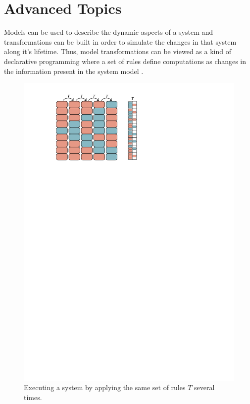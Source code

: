 \section{Advanced Topics}
\label{sec:advanced_topics}

Models can be used to describe the dynamic aspects of a system and
transformations can be built in order to simulate the changes in that system
along it's lifetime. Thus, model transformations can be viewed as a kind of
declarative programming where a set of rules define computations as changes in
the information present in the system model \cite{fundamentals_graph_transformations}.

\begin{figure}[h]
\begin{center}
  \includegraphics[scale=1, trim=3.0cm 21.7cm 9.5cm 0.9cm,
  clip]{imgs/system_dynamic.pdf}
  \caption{Executing a system by applying the same set of rules $T$ several
  times.}
  \label{fig:system_dynamic}
\end{center}
\end{figure}

